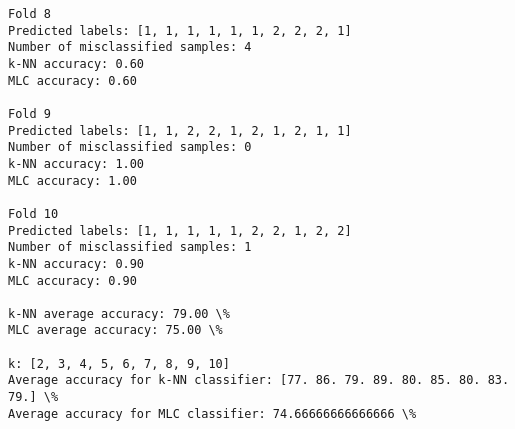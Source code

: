 \documentclass[11pt]{article}
\makeatletter
\newcommand{\boxspacing}{\kern\kvtcb@left@rule\kern\kvtcb@boxsep}
\newcommand{\prompt}[4]{
        {\ttfamily\llap{{\color{#2}[#3]:\hspace{3pt}#4}}\vspace{-\baselineskip}}
    }
\makeatother
\begin{document}
\begin{Verbatim}[commandchars=\\\{\}]
Fold 8
Predicted labels: [1, 1, 1, 1, 1, 1, 2, 2, 2, 1]
Number of misclassified samples: 4
k-NN accuracy: 0.60
MLC accuracy: 0.60

Fold 9
Predicted labels: [1, 1, 2, 2, 1, 2, 1, 2, 1, 1]
Number of misclassified samples: 0
k-NN accuracy: 1.00
MLC accuracy: 1.00

Fold 10
Predicted labels: [1, 1, 1, 1, 1, 2, 2, 1, 2, 2]
Number of misclassified samples: 1
k-NN accuracy: 0.90
MLC accuracy: 0.90

k-NN average accuracy: 79.00 \%
MLC average accuracy: 75.00 \%

k: [2, 3, 4, 5, 6, 7, 8, 9, 10]
Average accuracy for k-NN classifier: [77. 86. 79. 89. 80. 85. 80. 83. 79.] \%
Average accuracy for MLC classifier: 74.66666666666666 \%

    \end{Verbatim}

    \begin{tcolorbox}[breakable, size=fbox, boxrule=1pt, pad at break*=1mm,colback=cellbackground, colframe=cellborder]
\prompt{In}{incolor}{ }{\boxspacing}
\begin{Verbatim}[commandchars=\\\{\}]

\end{Verbatim}
\end{tcolorbox}


    
    
    
\end{document}
